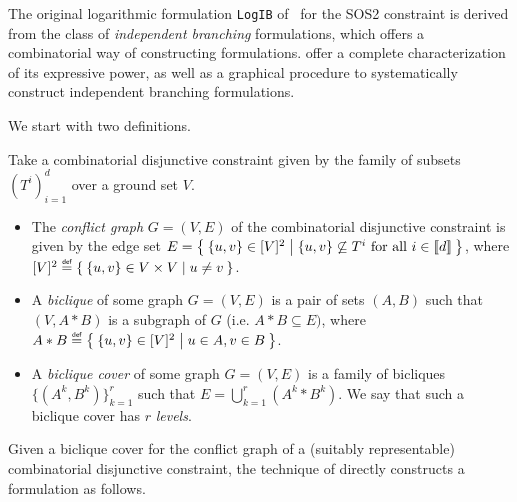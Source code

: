 \documentclass[opre,nonblindrev]{informs3} %
\newcommand{\blue}[1]{{#1}}
\newcommand\defeq{\mathrel{\overset{\makebox[0pt]{\mbox{\normalfont\tiny\sffamily def}}}{=}}}
\newcommand{\LogIB}{\texttt{LogIB}}
\begin{document}
The original logarithmic formulation \LogIB{} of~\cite{Vielma:2009a} for the SOS2 constraint is derived from the class of \emph{independent branching} formulations, which offers a combinatorial way of constructing formulations. \cite{Huchette:2016a} offer a complete characterization of its expressive power, as well as a graphical procedure to systematically construct independent branching formulations. \blue{
We start with two definitions.

\begin{definition}
Take a combinatorial disjunctive constraint given by the family of subsets $(T^i)_{i=1}^d$ over a ground set $V$.
\begin{itemize}
    \item The \emph{conflict graph} $G=(V,E)$ of the combinatorial disjunctive constraint is given by the edge set $E = \Set{\{u,v\} \in [V]^2 | \{u,v\} \not\subseteq T^i \text{ for all } i \in \llbracket d \rrbracket}$, where $[V]^2 \defeq \Set{\{u,v\} \in V \times V | u \neq v}$.
    \item A \emph{biclique} of some graph $G=(V,E)$ is a pair of sets $(A,B)$ such that $(V,A * B)$ is a subgraph of $G$ (i.e. $A * B \subseteq E)$, where $A * B \defeq \Set{ \{u,v\} \in [V]^2 | u \in A, v \in B}$.
    \item A \emph{biclique cover} of some graph $G = (V,E)$ is a family of bicliques $\{(A^k,B^k)\}_{k=1}^r$ such that $E = \bigcup_{k=1}^r (A^k * B^k)$. We say that such a biclique cover has $r$ \emph{levels}.
\end{itemize}
\end{definition}

Given a biclique cover for the conflict graph of a (suitably representable) combinatorial disjunctive constraint, the technique of \cite{Huchette:2016a} directly constructs a formulation as follows.}
\end{document}
